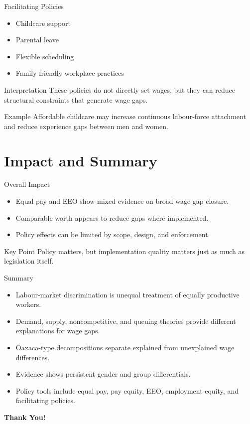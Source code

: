 \documentclass[aspectratio=169]{beamer}
\begin{document}
\begin{frame}{Facilitating Policies}
\transfade
\begin{itemize}[<+->]
  \item Childcare support
  \item Parental leave
  \item Flexible scheduling
  \item Family-friendly workplace practices
\end{itemize}

\begin{block}{Interpretation}
These policies do not directly set wages, but they can reduce structural constraints that generate wage gaps.
\end{block}

\begin{exampleblock}{Example}
Affordable childcare may increase continuous labour-force attachment and reduce experience gaps between men and women.
\end{exampleblock}
\end{frame}

\section{Impact and Summary}

\begin{frame}{Overall Impact}
\transfade
\begin{itemize}[<+->]
  \item Equal pay and EEO show mixed evidence on broad wage-gap closure.
  \item Comparable worth appears to reduce gaps where implemented.
  \item Policy effects can be limited by scope, design, and enforcement.
\end{itemize}

\begin{block}{Key Point}
Policy matters, but implementation quality matters just as much as legislation itself.
\end{block}
\end{frame}

\begin{frame}{Summary}
\transfade
\begin{itemize}[<+->]
  \item Labour-market discrimination is unequal treatment of equally productive workers.
  \item Demand, supply, noncompetitive, and queuing theories provide different explanations for wage gaps.
  \item Oaxaca-type decompositions separate explained from unexplained wage differences.
  \item Evidence shows persistent gender and group differentials.
  \item Policy tools include equal pay, pay equity, EEO, employment equity, and facilitating policies.
\end{itemize}


\end{frame}

\begin{frame}
\centering
\Huge{\textbf{Thank You!}}
\end{frame}
\end{document}
